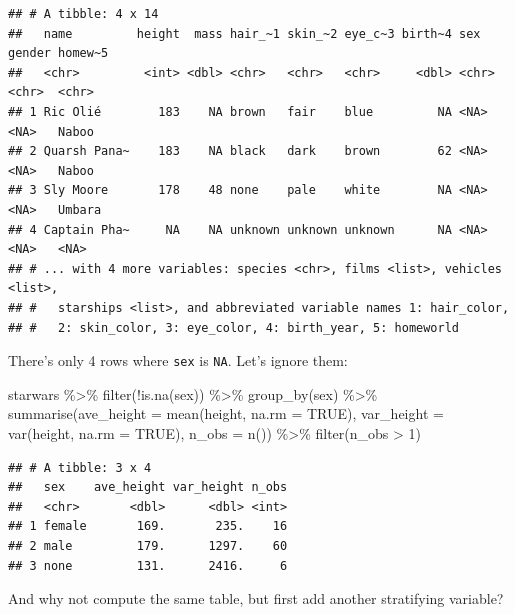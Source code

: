 \documentclass[
]{article}
\newenvironment{Shaded}{\begin{snugshade}}{\end{snugshade}}
\newcommand{\AttributeTok}[1]{\textcolor[rgb]{0.77,0.63,0.00}{#1}}
\newcommand{\ConstantTok}[1]{\textcolor[rgb]{0.00,0.00,0.00}{#1}}
\newcommand{\DecValTok}[1]{\textcolor[rgb]{0.00,0.00,0.81}{#1}}
\newcommand{\FunctionTok}[1]{\textcolor[rgb]{0.00,0.00,0.00}{#1}}
\newcommand{\NormalTok}[1]{#1}
\newcommand{\SpecialCharTok}[1]{\textcolor[rgb]{0.00,0.00,0.00}{#1}}
\begin{document}
\begin{verbatim}
## # A tibble: 4 x 14
##   name         height  mass hair_~1 skin_~2 eye_c~3 birth~4 sex   gender homew~5
##   <chr>         <int> <dbl> <chr>   <chr>   <chr>     <dbl> <chr> <chr>  <chr>  
## 1 Ric Olié        183    NA brown   fair    blue         NA <NA>  <NA>   Naboo  
## 2 Quarsh Pana~    183    NA black   dark    brown        62 <NA>  <NA>   Naboo  
## 3 Sly Moore       178    48 none    pale    white        NA <NA>  <NA>   Umbara 
## 4 Captain Pha~     NA    NA unknown unknown unknown      NA <NA>  <NA>   <NA>   
## # ... with 4 more variables: species <chr>, films <list>, vehicles <list>,
## #   starships <list>, and abbreviated variable names 1: hair_color,
## #   2: skin_color, 3: eye_color, 4: birth_year, 5: homeworld
\end{verbatim}

There's only 4 rows where \texttt{sex} is \texttt{NA}. Let's ignore them:

\begin{Shaded}
\begin{Highlighting}[]
\NormalTok{starwars }\SpecialCharTok{\%\textgreater{}\%}
  \FunctionTok{filter}\NormalTok{(}\SpecialCharTok{!}\FunctionTok{is.na}\NormalTok{(sex)) }\SpecialCharTok{\%\textgreater{}\%}
  \FunctionTok{group\_by}\NormalTok{(sex) }\SpecialCharTok{\%\textgreater{}\%}
  \FunctionTok{summarise}\NormalTok{(}\AttributeTok{ave\_height =} \FunctionTok{mean}\NormalTok{(height, }\AttributeTok{na.rm =} \ConstantTok{TRUE}\NormalTok{),}
            \AttributeTok{var\_height =} \FunctionTok{var}\NormalTok{(height, }\AttributeTok{na.rm =} \ConstantTok{TRUE}\NormalTok{),}
            \AttributeTok{n\_obs =} \FunctionTok{n}\NormalTok{()) }\SpecialCharTok{\%\textgreater{}\%}
  \FunctionTok{filter}\NormalTok{(n\_obs }\SpecialCharTok{\textgreater{}} \DecValTok{1}\NormalTok{)}
\end{Highlighting}
\end{Shaded}

\begin{verbatim}
## # A tibble: 3 x 4
##   sex    ave_height var_height n_obs
##   <chr>       <dbl>      <dbl> <int>
## 1 female       169.       235.    16
## 2 male         179.      1297.    60
## 3 none         131.      2416.     6
\end{verbatim}

And why not compute the same table, but first add another stratifying variable?
\end{document}
